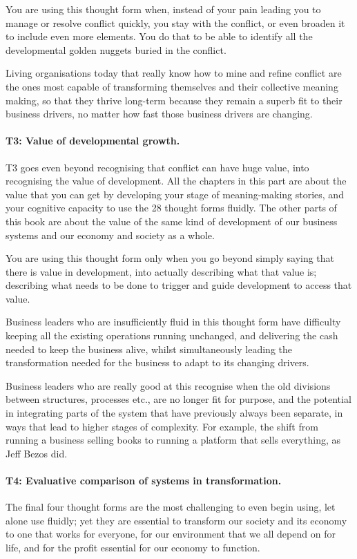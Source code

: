 You are using this thought form when, instead of your pain leading you to manage or resolve conflict quickly, you stay with the conflict, or even broaden it to include even more elements. You do that to be able to identify all the developmental golden nuggets buried in the conflict.


Living organisations  today that really know how to mine and refine conflict are the ones most capable of transforming themselves and their collective meaning making, so that they thrive long-term because they remain a superb fit to their business drivers, no matter how fast those business drivers are changing.
\paragraph{\textbf{T3: Value of developmental growth.}}
T3 goes even beyond recognising that conflict can have huge value, into recognising the value of development. All the chapters in this part are about the value that you can get by developing your stage of meaning-making stories, and your cognitive capacity to use the 28 thought forms fluidly. The other parts of this book are about the value of the same kind of development of our business systems and our economy and society as a whole.


You are using this thought form only when you go beyond simply saying that there is value in development, into actually describing what that value is; describing what needs to be done to trigger and guide development to access that value.


Business leaders who are insufficiently fluid in this thought form have difficulty keeping all the existing operations running unchanged, and delivering the cash needed to keep the business alive, whilst simultaneously leading the transformation needed for the business to adapt to its changing drivers.


Business leaders who are really good at this recognise when the old divisions between structures, processes etc., are no longer fit for purpose, and the potential in integrating parts of the system that have previously always been separate, in ways that lead to higher stages of complexity. For example, the shift from running a business selling books to running a platform that sells everything, as Jeff Bezos did.


\paragraph{\textbf{T4: Evaluative comparison of systems in transformation.}}
The final four thought forms are the most challenging to even begin using, let alone use fluidly; yet they are essential to transform our society and its economy to one that works for everyone, for our environment that we all depend on for life, and for the profit essential for our economy to function.



